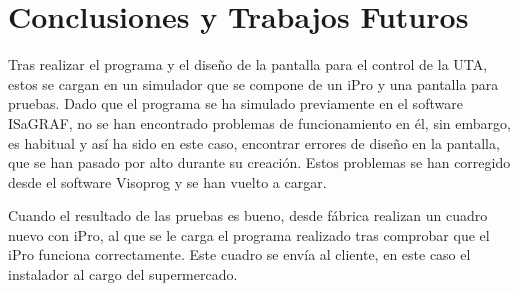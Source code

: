 
\cleardoublepage
\chapter{Conclusiones y Trabajos Futuros}

\label{chap:conclusiones} %

Tras realizar el programa y el diseño de la pantalla para el control de la UTA, estos se cargan en un simulador que se compone de un iPro y una pantalla para pruebas. Dado que el programa se ha simulado previamente en el software ISaGRAF, no se han encontrado problemas de funcionamiento en él, sin embargo, es habitual y así ha sido en este caso, encontrar errores de diseño en la pantalla, que se han pasado por alto durante su creación. Estos problemas se han corregido desde el software Visoprog y se han vuelto a cargar.

Cuando el resultado de las pruebas es bueno, desde fábrica realizan un cuadro nuevo con iPro, al que se le carga el programa realizado tras comprobar que el iPro funciona correctamente. Este cuadro se envía al cliente, en este caso el instalador al cargo del supermercado.

